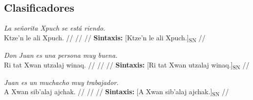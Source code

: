 \documentclass{article}%
\begin{document}
\subsection{Clasificadores}%
\label{subsec:Clasificadores}%

%
\par\medskip%
\ex
\textit{La señorita Xpuch se está riendo.} \\
\begingl
\gla Ktze'n le ali Xpuch. //
\glb  //
\glc  //
\glft \textbf{Sintaxis:} [Ktze'n le ali Xpuch.]\textsubscript{SN} //
\endgl
\xe
%
\medskip%
\par\medskip%
\ex
\textit{Don Juan es una persona muy buena.} \\
\begingl
\gla Ri tat Xwan utzalaj winaq. //
\glb  //
\glc  //
\glft \textbf{Sintaxis:} [Ri tat Xwan utzalaj winaq.]\textsubscript{SN} //
\endgl
\xe
%
\medskip%
\par\medskip%
\ex
\textit{Juan es un muchacho muy trabajador.} \\
\begingl
\gla A Xwan sib'alaj ajchak. //
\glb  //
\glc  //
\glft \textbf{Sintaxis:} [A Xwan sib'alaj ajchak.]\textsubscript{SN} //
\endgl
\xe
%

%
\end{document}
